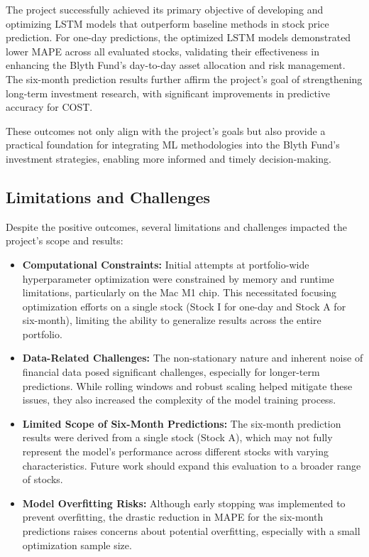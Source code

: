 \documentclass[10pt,twocolumn]{article}
\begin{document}
The project successfully achieved its primary objective of developing and optimizing LSTM models that outperform baseline methods in stock price prediction. For one-day predictions, the optimized LSTM models demonstrated lower MAPE across all evaluated stocks, validating their effectiveness in enhancing the Blyth Fund’s day-to-day asset allocation and risk management. The six-month prediction results further affirm the project's goal of strengthening long-term investment research, with significant improvements in predictive accuracy for COST.

These outcomes not only align with the project's goals but also provide a practical foundation for integrating ML methodologies into the Blyth Fund’s investment strategies, enabling more informed and timely decision-making.

\subsection{Limitations and Challenges}

Despite the positive outcomes, several limitations and challenges impacted the project's scope and results:

\begin{itemize}
    \item \textbf{Computational Constraints:} Initial attempts at portfolio-wide hyperparameter optimization were constrained by memory and runtime limitations, particularly on the Mac M1 chip. This necessitated focusing optimization efforts on a single stock (Stock I for one-day and Stock A for six-month), limiting the ability to generalize results across the entire portfolio.
    
    \item \textbf{Data-Related Challenges:} The non-stationary nature and inherent noise of financial data posed significant challenges, especially for longer-term predictions. While rolling windows and robust scaling helped mitigate these issues, they also increased the complexity of the model training process.
    
    \item \textbf{Limited Scope of Six-Month Predictions:} The six-month prediction results were derived from a single stock (Stock A), which may not fully represent the model's performance across different stocks with varying characteristics. Future work should expand this evaluation to a broader range of stocks.
    
    \item \textbf{Model Overfitting Risks:} Although early stopping was implemented to prevent overfitting, the drastic reduction in MAPE for the six-month predictions raises concerns about potential overfitting, especially with a small optimization sample size.
\end{itemize}
\end{document}
